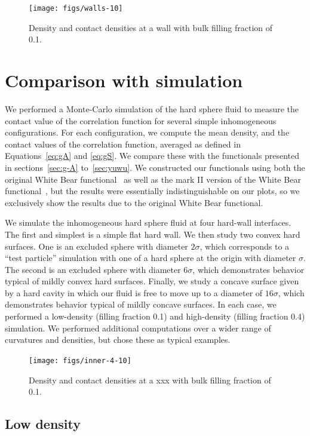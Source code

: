 \documentclass[letterpaper,twocolumn,amsmath,amssymb,jcp,10pt,aip]{revtex4-1}
\begin{document}
\begin{figure}
  \texttt{[image: figs/walls-10]}
  \caption{Density and contact densities at a wall with bulk filling
    fraction of 0.1.}
  \label{fig:walls-10}
\end{figure}

\section{Comparison with simulation}\label{sec:comparison}

We performed a Monte-Carlo simulation of the hard sphere fluid to
measure the contact value of the correlation function for several
simple inhomogeneous configurations.  For each configuration, we
compute the mean density, and the contact values of the correlation
function, averaged as defined in Equations~\ref{eq:gA} and
\ref{eq:gS}.  We compare these with the functionals presented in
sections~\ref{sec:g-A} to~\ref{sec:yuwu}.  We constructed our
functionals using both the original White Bear
functional~\cite{roth2002whitebear} as well as the mark II version of
the White Bear functional~\cite{hansen2006density}, but the results
were essentially indistinguishable on our plots, so we exclusively
show the results due to the original White Bear functional.

We simulate the inhomogeneous hard sphere fluid at four hard-wall
interfaces.  The first and simplest is a simple flat hard wall.  We
then study two convex hard surfaces.  One is an excluded sphere with
diameter $2\sigma$, which corresponds to a ``test particle''
simulation with one of a hard sphere at the origin with diameter
$\sigma$.  The second is an excluded sphere with diameter $6\sigma$,
which demonstrates behavior typical of mildly convex hard surfaces.
Finally, we study a concave surface given by a hard cavity in which
our fluid is free to move up to a diameter of $16\sigma$, which
demonstrates behavior typical of mildly concave surfaces.  In each
case, we performed a low-density (filling fraction 0.1) and high-density
(filling fraction 0.4) simulation.  We performed additional
computations over a wider range of curvatures and densities, but
chose these as typical examples.


\begin{figure}
  \texttt{[image: figs/inner-4-10]}
  \caption{Density and contact densities at a xxx with bulk filling
    fraction of 0.1.}
  \label{fig:inner-4-10}
\end{figure}

\subsection{Low density}
\end{document}
